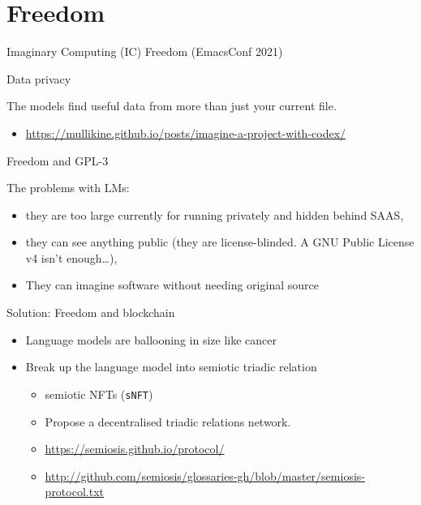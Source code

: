 \documentclass[presentation]{beamer}
\begin{document}
\section{Freedom}
\label{sec:org458d057}
\begin{frame}[label={sec:org59d8ce9},fragile]{Imaginary Computing (IC) Freedom (EmacsConf 2021)}
 \begin{block}{Data privacy}
{\tiny
The models find useful data from more than just your current file.
\begin{itemize}
\item \url{https://mullikine.github.io/posts/imagine-a-project-with-codex/}
\end{itemize}
}
\end{block}

\begin{block}{Freedom and GPL-3}
{\tiny
The problems with LMs:
\begin{itemize}
\item they are too large currently for running privately and hidden behind SAAS,
\item they can see anything public (they are license-blinded. A GNU Public License v4 isn't enough\ldots{}),
\item They can imagine software without needing original source
\end{itemize}
}
\end{block}

\begin{block}{Solution: Freedom and blockchain}
\begin{itemize}
\item Language models are ballooning in size like cancer
\item Break up the language model into semiotic triadic relation
\begin{itemize}
\item semiotic NFTs (\texttt{sNFT})
\item Propose a decentralised triadic relations network.
\item \url{https://semiosis.github.io/protocol/}
\item \url{http://github.com/semiosis/glossaries-gh/blob/master/semiosis-protocol.txt}
\end{itemize}
\end{itemize}
\end{block}
\end{frame}
\end{document}
